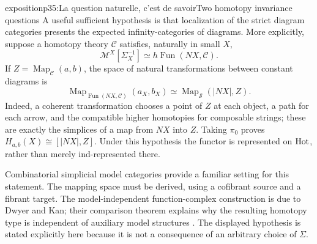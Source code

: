 \begin{dcomment}{exposition}{p35:La question naturelle, c'est de savoir}{Two homotopy invariance questions}
A useful sufficient hypothesis is that localization of the strict diagram categories presents the expected infinity-categories of diagrams. More explicitly, suppose a homotopy theory $\mathcal C$ satisfies, naturally in small $X$,
\[
 \mathcal M^X[\Sigma_X^{-1}]
   \simeq h\operatorname{Fun}(NX,\mathcal C).
\]
If $Z=\operatorname{Map}_{\mathcal C}(a,b)$, the space of natural transformations between constant diagrams is
\[
 \operatorname{Map}_{\operatorname{Fun}(NX,\mathcal C)}(a_X,b_X)
   \simeq\operatorname{Map}_{\mathcal S}(|NX|,Z).
\]
Indeed, a coherent transformation chooses a point of $Z$ at each object, a path for each arrow, and the compatible higher homotopies for composable strings; these are exactly the simplices of a map from $NX$ into $Z$. Taking $\pi_0$ proves $H_{a,b}(X)\cong[|NX|,Z]$. Under this hypothesis the functor is represented on $\mathrm{Hot}$, rather than merely ind-represented there.

Combinatorial simplicial model categories provide a familiar setting for this statement. The mapping space must be derived, using a cofibrant source and a fibrant target. The model-independent function-complex construction is due to Dwyer and Kan; their comparison theorem explains why the resulting homotopy type is independent of auxiliary model structures \citep[\S4]{DwyerKan1980Function}. The displayed hypothesis is stated explicitly here because it is not a consequence of an arbitrary choice of $\Sigma$.
\end{dcomment}


